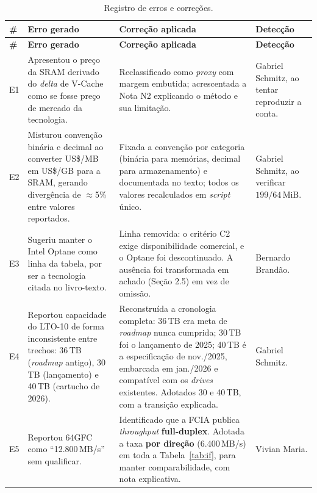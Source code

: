 \documentclass[11pt,a4paper]{article}
\begin{document}
\begin{center}\footnotesize
\setlength{\tabcolsep}{4pt}
\begin{longtable}{@{}p{0.5cm}>{\RaggedRight\arraybackslash}p{4.4cm}>{\RaggedRight\arraybackslash}p{5.2cm}>{\RaggedRight\arraybackslash}p{4.4cm}@{}}
\caption{Registro de erros e correções.}\\
\toprule
\textbf{\#} & \textbf{Erro gerado} & \textbf{Correção aplicada} & \textbf{Detecção} \\
\midrule
\endfirsthead
\toprule
\textbf{\#} & \textbf{Erro gerado} & \textbf{Correção aplicada} & \textbf{Detecção} \\
\midrule
\endhead
\bottomrule
\endfoot

E1 & Apresentou o preço da SRAM derivado do \emph{delta} de V-Cache como se fosse preço de
mercado da tecnologia. &
Reclassificado como \emph{proxy} com margem embutida; acrescentada a Nota N2 explicando o
método e sua limitação. & Gabriel Schmitz, ao tentar reproduzir a conta. \\

E2 & Misturou convenção binária e decimal ao converter US\$/MB em US\$/GB para a SRAM,
gerando divergência de $\approx$5\% entre valores reportados. &
Fixada a convenção por categoria (binária para memórias, decimal para armazenamento) e
documentada no texto; todos os valores recalculados em \emph{script} único. &
Gabriel Schmitz, ao verificar $199/64\,\text{MiB}$. \\

E3 & Sugeriu manter o Intel Optane como linha da tabela, por ser a tecnologia citada no
livro-texto. &
Linha removida: o critério C2 exige disponibilidade comercial, e o Optane foi
descontinuado. A ausência foi transformada em achado (Seção 2.5) em vez de omissão. &
Bernardo Brandão. \\

E4 & Reportou capacidade do LTO-10 de forma inconsistente entre trechos: 36\,TB
(\emph{roadmap} antigo), 30\,TB (lançamento) e 40\,TB (cartucho de 2026). &
Reconstruída a cronologia completa: 36\,TB era meta de \emph{roadmap} nunca cumprida;
30\,TB foi o lançamento de 2025; 40\,TB é a especificação de nov./2025, embarcada em
jan./2026 e compatível com os \emph{drives} existentes. Adotados 30 e 40\,TB, com a
transição explicada. & Gabriel Schmitz. \\

E5 & Reportou 64GFC como ``12.800\,MB/s'' sem qualificar. &
Identificado que a FCIA publica \emph{throughput} \textbf{full-duplex}. Adotada a taxa
\textbf{por direção} (6.400\,MB/s) em toda a Tabela~\ref{tab:if}, para manter
comparabilidade, com nota explicativa. & Vivian Maria. \\


\end{longtable}
\end{center}
\end{document}
